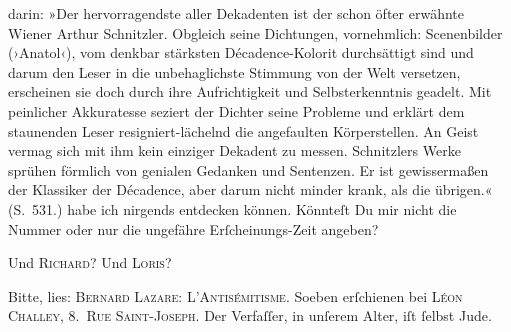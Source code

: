 {{{                  darin: »Der hervorragendste aller Dekadenten ist der schon öfter erwähnte
                        Wiener Arthur Schnitzler. Obgleich seine Dichtungen, vornehmlich:
                     Scenenbilder (›Anatol‹), vom denkbar
                     stärksten Décadence-Kolorit durchsättigt sind und darum den Leser in die
                     unbehaglichste Stimmung von der Welt versetzen, erscheinen sie doch durch ihre
                     Aufrichtigkeit und Selbsterkenntnis geadelt. Mit peinlicher Akkuratesse seziert
                     der Dichter seine
                     Probleme und erklärt dem staunenden Leser resigniert-lächelnd die angefaulten
                     Körperstellen. An Geist vermag sich mit ihm kein einziger Dekadent zu messen.
                        Schnitzlers Werke sprühen förmlich von
                     genialen Gedanken und Sentenzen. Er ist gewissermaßen der Klassiker der
                     Décadence, aber darum nicht minder krank, als die übrigen.«
                     (S. 531.)}}}\label{K_L02621-12} habe ich nirgends entdecken können. Könnteſt Du
               mir nicht die Nummer oder nur die ungefähre Erſcheinungs-Zeit angeben?\pend
           
\pstart
           Und \textsc{Richard}? Und \textsc{Loris}?\pend
           
\pstart
           Bitte, lies: \textsc{Bernard Lazare}: \textsc{L’Antisémitisme}. Soeben erſchienen bei \textsc{Léon Challey}, \textsc{8. Rue Saint-Joseph}. Der Verfaſſer, in
               unſerem Alter, iſt ſelbst Jude.\pend
           
